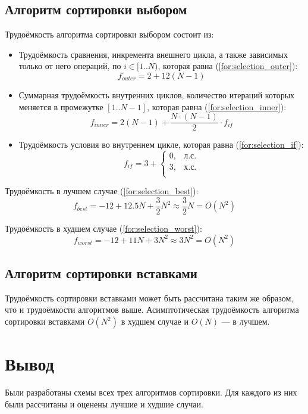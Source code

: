 \subsection{Алгоритм сортировки выбором}

Трудоёмкость алгоритма сортировки выбором состоит из:
\begin{itemize}
    \item Трудоёмкость сравнения, инкремента внешнего цикла, а также зависимых только от него операций, по $i \in [1..N)$, которая равна (\ref{for:selection_outer}):
        \begin{equation}
            \label{for:selection_outer}
            f_{outer} = 2 + 12(N - 1)
        \end{equation}
    \item Суммарная трудоёмкость внутренних циклов, количество итераций которых меняется в промежутке $[1..N-1]$, которая равна (\ref{for:selection_inner}):
        \begin{equation}
            \label{for:selection_inner}
            f_{inner} = 2(N - 1) + \frac{N \cdot (N - 1)}{2} \cdot f_{if}
        \end{equation}
    \item Трудоёмкость условия во внутреннем цикле, которая равна (\ref{for:selection_if}):
        \begin{equation}
            \label{for:selection_if}
            f_{if} = 3 + \begin{cases}
                0, & \text{л.с.}\\
                3, & \text{х.с.}\\
            \end{cases}
        \end{equation}
\end{itemize}

Трудоёмкость в лучшем случае (\ref{for:selection_best}):
\begin{equation}
    \label{for:selection_best}
    f_{best} = -12 + 12.5N + \frac{3}{2}N^2 \approx \frac{3}{2}N = O(N^2)
\end{equation}

Трудоёмкость в худшем случае (\ref{for:selection_worst}):
\begin{equation}
    \label{for:selection_worst}
    f_{worst} = -12 + 11N + 3N^2 \approx 3N^2 = O(N^2)
\end{equation}


\subsection{Алгоритм сортировки вставками}

Трудоёмкость сортировки вставками может быть рассчитана таким же образом, что и трудоёмкости алгоритмов выше. Асимптотическая трудоёмкость алгоритма сортировки вставками $O(N^2)$ в худшем случае и $O(N)$ --- в лучшем.

\section*{Вывод}

Были разработаны схемы всех трех алгоритмов сортировки.
Для каждого из них были рассчитаны и оценены лучшие и худшие случаи.
